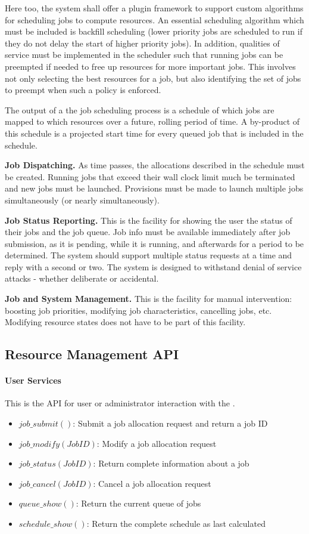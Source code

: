 Here too, the system shall offer a plugin framework to support custom
algorithms for scheduling jobs to compute resources.  An essential
scheduling algorithm which must be included is backfill scheduling
(lower priority jobs are scheduled to run if they do not delay the
start of higher priority jobs).  In addition, qualities of service must
be implemented in the scheduler such that running jobs can be
preempted if needed to free up resources for more important jobs.
This involves not only selecting the best resources for a job, but
also identifying the set of jobs to preempt when such a policy is
enforced.

The output of a the job scheduling process is a schedule of which jobs
are mapped to which resources over a future, rolling period of time.
A by-product of this schedule is a projected start time for every
queued job that is included in the schedule.

\textbf{Job Dispatching.} As time passes, the allocations described in
the schedule must be created.  Running jobs that exceed their wall
clock limit much be terminated and new jobs must be launched.
Provisions must be made to launch multiple jobs simultaneously (or
nearly simultaneously).

\textbf{Job Status Reporting.} This is the facility for showing the
user the status of their jobs and the job queue.  Job info must be
available immediately after job submission, as it is pending, while it
is running, and afterwards for a period to be determined.  The system
should support multiple status requests at a time and reply with a
second or two.  The system is designed to withstand denial of service
attacks - whether deliberate or accidental.

\textbf{Job and System Management.} This is the facility for manual
intervention: boosting job priorities, modifying job characteristics,
cancelling jobs, etc.  Modifying resource states does not have to be
part of this facility.

\subsection{Resource Management API}

\paragraph{User Services}
This is the API for user or administrator interaction with the \ngrm.

\begin{itemize}
\item{$job\_submit()$: Submit a job allocation request and return a
  job ID}
\item{$job\_modify(JobID)$: Modify a job allocation request}
\item{$job\_status(JobID)$: Return complete information about a job}
\item{$job\_cancel(JobID)$: Cancel a job allocation request}
\item{$queue\_show()$: Return the current queue of jobs}
\item{$schedule\_show()$: Return the complete schedule as last
  calculated}
\end{itemize}

